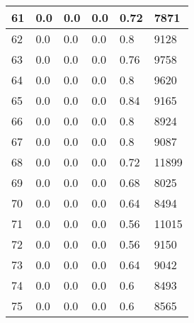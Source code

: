 \begin{longtable}{|l|l|l|l|l|l|}
61 & 0.0 & 0.0 & 0.0 & 0.72 & 7871 \\ \hline 
62 & 0.0 & 0.0 & 0.0 & 0.8 & 9128 \\ \hline 
63 & 0.0 & 0.0 & 0.0 & 0.76 & 9758 \\ \hline 
64 & 0.0 & 0.0 & 0.0 & 0.8 & 9620 \\ \hline 
65 & 0.0 & 0.0 & 0.0 & 0.84 & 9165 \\ \hline 
66 & 0.0 & 0.0 & 0.0 & 0.8 & 8924 \\ \hline 
67 & 0.0 & 0.0 & 0.0 & 0.8 & 9087 \\ \hline 
68 & 0.0 & 0.0 & 0.0 & 0.72 & 11899 \\ \hline 
69 & 0.0 & 0.0 & 0.0 & 0.68 & 8025 \\ \hline 
70 & 0.0 & 0.0 & 0.0 & 0.64 & 8494 \\ \hline 
71 & 0.0 & 0.0 & 0.0 & 0.56 & 11015 \\ \hline 
72 & 0.0 & 0.0 & 0.0 & 0.56 & 9150 \\ \hline 
73 & 0.0 & 0.0 & 0.0 & 0.64 & 9042 \\ \hline 
74 & 0.0 & 0.0 & 0.0 & 0.6 & 8493 \\ \hline 
75 & 0.0 & 0.0 & 0.0 & 0.6 & 8565 \\ \hline 
\end{longtable}